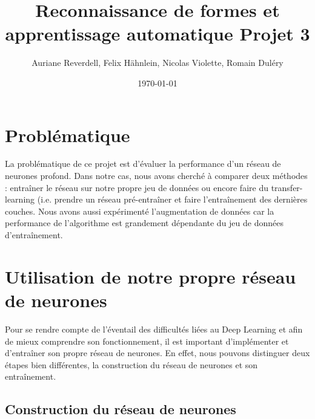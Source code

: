 \documentclass[a4paper,11pt]{article}
\title{Reconnaissance de formes et apprentissage automatique Projet 3}
\author{Auriane Reverdell, Felix Hähnlein, Nicolas Violette, Romain Duléry}
\date{\today}
\begin{document}
\maketitle
\vspace{1cm}

\section{Problématique}
    
    La problématique de ce projet est d'évaluer la performance d'un réseau de neurones profond. Dans
    notre cas, nous avons cherché à comparer deux méthodes : entraîner le réseau sur notre propre
    jeu de données ou encore faire du transfer-learning (i.e. prendre un réseau pré-entraîner et
    faire l'entraînement des dernières couches. Nous avons aussi expérimenté l'augmentation de données
    car la performance de l'algorithme est grandement dépendante du jeu de données d'entraînement.

\section{Utilisation de notre propre réseau de neurones}

    Pour se rendre compte de l'éventail des difficultés liées au Deep Learning et afin de mieux comprendre son fonctionnement, il est important d'implémenter et d'entraîner son propre réseau de neurones.
    En effet, nous pouvons distinguer deux étapes bien différentes, la construction du réseau de neurones et son entraînement.

\subsection{Construction du réseau de neurones}
    
\end{document}
